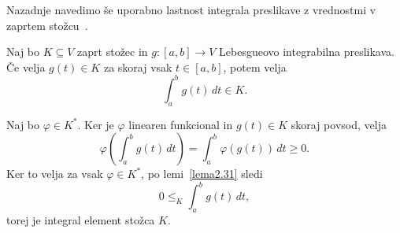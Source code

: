 \documentclass[mat2, tisk]{fmfdelo}
\begin{document}
Nazadnje navedimo še uporabno lastnost integrala
preslikave z vrednostmi v zaprtem stožcu~\cite{chen2026conedomains}.

\begin{lema}\label{lema:integral_stozca}
Naj bo $K \subseteq V$ zaprt stožec in
$g \colon [a,b] \to V$ Lebesgueovo integrabilna
preslikava. Če velja $g(t)\in K$ za skoraj vsak
$t\in[a,b]$, potem velja
\[
\int_a^b g(t)\,dt\in K.
\]
\end{lema}

\begin{dokaz}
Naj bo $\varphi\in K^*$. Ker je $\varphi$
linearen funkcional in $g(t)\in K$ skoraj
povsod, velja
\[
\varphi\left(\int_a^b g(t)\,dt\right)
=
\int_a^b\varphi(g(t))\,dt
\geq 0.
\]
Ker to velja za vsak $\varphi\in K^*$, po
lemi~\ref{lema2.31} sledi
\[
0\leq_K\int_a^b g(t)\,dt,
\]
torej je integral element stožca $K$.
\end{dokaz}


%
\end{document}
